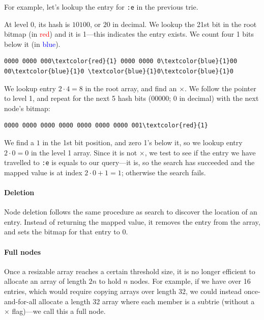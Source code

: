 \documentclass[preprint]{sigplanconf}
\begin{document}
For example, let's lookup the entry
for \texttt{:e} in the previous trie.

At level 0, its hash is $10100$, or
$20$ in decimal.
We lookup the 21st bit in the root
bitmap (in \textcolor{red}{red}) and it is 1---this
indicates the entry exists.
We count four 1 bits below it (in \textcolor{blue}{blue}).

\begin{Verbatim}[commandchars=\\\{\},codes={\catcode`$=3\catcode`^=7\catcode`_=8}]
0000 0000 000\textcolor{red}{1} 0000 0000 0\textcolor{blue}{1}00 00\textcolor{blue}{1}0 \textcolor{blue}{1}0\textcolor{blue}{1}0
\end{Verbatim}

We lookup entry $2\cdot4 = 8$ in
the root array, and find an $\times$.
We follow the pointer to level 1, and
repeat for the next 5 hash bits ($00000$; $0$ in decimal)
with the next node's bitmap:

\begin{Verbatim}[commandchars=\\\{\},codes={\catcode`$=3\catcode`^=7\catcode`_=8}]
0000 0000 0000 0000 0000 0000 0000 001\textcolor{red}{1}
\end{Verbatim}

We find a $1$ in the 1st bit position, and zero
1's below it, so we lookup entry
$2\cdot0 = 0$ in the level 1 array.
Since it is not $\times$, we test
to see if the entry we have travelled
to \texttt{:e} is equals to 
our query---it is, so the search has
succeeded and the mapped value is at index
$2\cdot0+1 = 1$; otherwise
the search fails.

\paragraph{Deletion}
Node deletion follows the same procedure as search to
discover the location of an entry.
Instead of returning the mapped value, it removes
the entry from the array, and sets the bitmap
for that entry to 0.

\paragraph{Full nodes}
Once a resizable array reaches a certain threshold
size, it is no longer efficient to allocate
an array of length $2n$ to hold $n$ nodes.
For example, if we have over 16 entries, which
would require copying arrays over length 32, we could
instead once-and-for-all allocate a length 32
array where each member is a subtrie
(without a $\times$ flag)---we call this a full
node.
\end{document}

